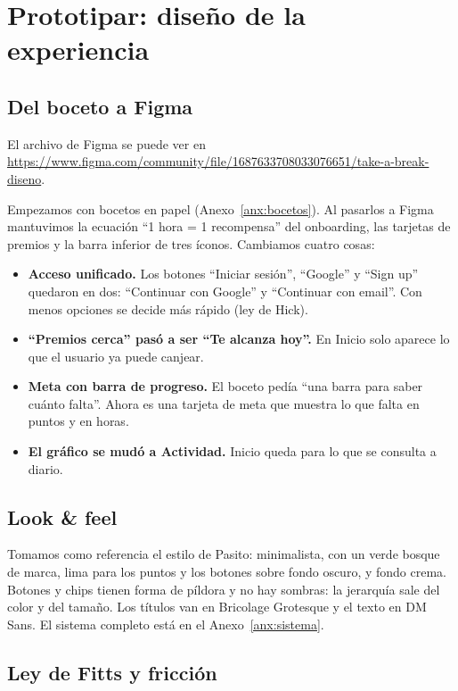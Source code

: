 \section{Prototipar: diseño de la experiencia}
\label{sec:prototipar}

\subsection{Del boceto a Figma}

El archivo de Figma se puede ver en \url{https://www.figma.com/community/file/1687633708033076651/take-a-break-diseno}.

Empezamos con bocetos en papel (Anexo~\ref{anx:bocetos}). Al pasarlos a Figma mantuvimos la ecuación “1 hora = 1 recompensa” del onboarding, las tarjetas de premios y la barra inferior de tres íconos. Cambiamos cuatro cosas:

\begin{itemize}
\item \textbf{Acceso unificado.} Los botones “Iniciar sesión”, “Google” y “Sign up” quedaron en dos: “Continuar con Google” y “Continuar con email”. Con menos opciones se decide más rápido (ley de Hick).
\item \textbf{“Premios cerca” pasó a ser “Te alcanza hoy”.} En Inicio solo aparece lo que el usuario ya puede canjear.
\item \textbf{Meta con barra de progreso.} El boceto pedía “una barra para saber cuánto falta”. Ahora es una tarjeta de meta que muestra lo que falta en puntos y en horas.
\item \textbf{El gráfico se mudó a Actividad.} Inicio queda para lo que se consulta a diario.
\end{itemize}

\subsection{Look \& feel}

Tomamos como referencia el estilo de Pasito: minimalista, con un verde bosque de marca, lima para los puntos y los botones sobre fondo oscuro, y fondo crema. Botones y chips tienen forma de píldora y no hay sombras: la jerarquía sale del color y del tamaño. Los títulos van en Bricolage Grotesque y el texto en DM Sans. El sistema completo está en el Anexo~\ref{anx:sistema}.

\subsection{Ley de Fitts y fricción}

